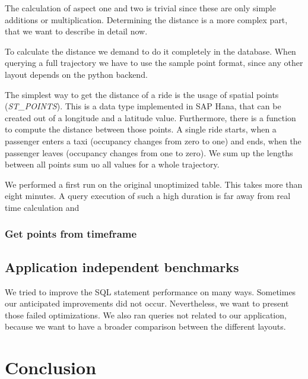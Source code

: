 \documentclass[10pt]{sig-alternate}
\begin{document}
The calculation of aspect one and two is trivial since these are only simple additions or multiplication. Determining the distance is a more complex part, that we want to describe in detail now.

To calculate the distance we demand to do it completely in the database. When querying a full trajectory we have to use the sample point format, since any other layout depends on the python backend.

The simplest way to get the distance of a ride is the usage of spatial points (\textit{ST\_POINTS}). This is a data type implemented in SAP Hana, that can be created out of a longitude and a latitude value. Furthermore, there is a function to compute the distance between those points. A single ride starts, when a passenger enters a taxi (occupancy changes from zero to one) and ends, when the passenger leaves (occupancy changes from one to zero). We sum up the lengths between all points sum uo all values for a whole trajectory.

We performed a first run on the original unoptimized table. This takes more than eight minutes. A query execution of such a high duration is far away from real time calculation and 


\subsubsection{Get points from timeframe}

\subsection{Application independent benchmarks}
We tried to improve the SQL statement performance on many ways. Sometimes our anticipated improvements did not occur. Nevertheless, we want to present those failed optimizations. We also ran queries not related to our application, because we want to have a broader comparison between the different layouts.

\section{Conclusion}

% 


\end{document}
